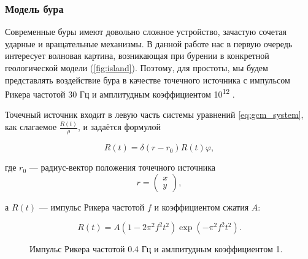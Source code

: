 \subsubsection{Модель бура}

Современные буры имеют довольно сложное устройство, зачастую сочетая ударные и вращательные механизмы. В данной работе нас в первую очередь интересует волновая картина, возникающая при бурении в конкретной геологической модели (\autoref{fig:island}). Поэтому, для простоты, мы будем представлять воздействие бура в качестве точечного источника с импульсом Рикера частотой 30 Гц и амплитудным коэффициентом 10\textsuperscript{12} \cite{favorskaya_thesis}.

Точечный источник входит в левую часть системы уравнений \eqref{eq:gcm_system}, как слагаемое $\frac{R(t)}{\rho}$, и задаётся формулой

\begin{equation}
    R(t) =  \delta\left(r - r_0\right) R(t) \varphi ,
    \label{eq:ricker}
\end{equation}

\noindent где $r_0$ --- радиус-вектор положения точечного источника
\begin{equation*}
    r = \begin{pmatrix} x \\ y \end{pmatrix},
\end{equation*}

\noindent а $R(t)$ --- импульс Рикера частотой $f$ и коэффициентом сжатия $A$:

\begin{equation*}
    R(t) = A \left(1-2\pi^2 f^2 t^2\right) \exp \left(-\pi^2 f^2 t^2\right).
\end{equation*}

\begin{figure}[!htb]
\centering
\caption{Импульс Рикера частотой 0.4 Гц и амлпитудным коэффициентом 1.}
\label{fig:ricker_plot}
\end{figure}

